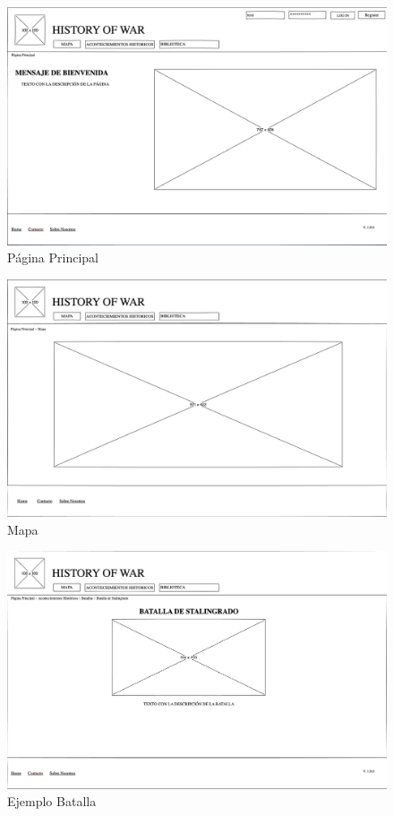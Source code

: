 \documentclass{article}
\begin{document}
\begin{figure}[H]
    \centering
    \includegraphics[width=1\textwidth]{Wireframes/PaginaPrincipal.jpg}
    \caption{Página Principal}
    \label{fig:mi_imagen}
\end{figure}

\begin{figure}[H]
    \centering
    \includegraphics[width=1\textwidth]{Wireframes/Mapa.jpg}
    \caption{Mapa}
    \label{fig:mi_imagen}
\end{figure}

\begin{figure}[H]
    \centering
    \includegraphics[width=1\textwidth]{Wireframes/EjemploBatalla.jpg}
    \caption{Ejemplo Batalla}
    \label{fig:mi_imagen}
\end{figure}
\end{document}
